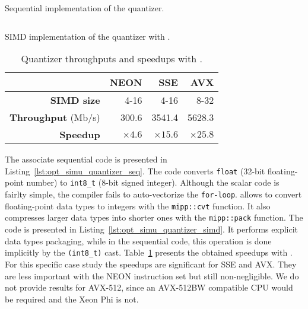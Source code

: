 \begin{listing}[htp]
  \inputminted[frame=lines,linenos]{C++}{\curChapter/src/simu/quantizer/quantizer_seq.cpp}
  \caption{Sequential implementation of the quantizer.}
  \label{lst:opt_simu_quantizer_seq}
\end{listing}

\begin{listing}[htp]
  \inputminted[frame=lines,linenos]{C++}{\curChapter/src/simu/quantizer/quantizer_simd.cpp}
  \caption{SIMD implementation of the quantizer with \MIPP.}
  \label{lst:opt_simu_quantizer_simd}
\end{listing}

\begin{table}[htp]
  \centering
  \caption{Quantizer throughputs and speedups with \MIPP.}
  \label{tab:opt_simu_quantizer_speedup}
  \begin{tabular}{r | r  r r}
                             & \textbf{NEON} & \textbf{SSE}  & \textbf{AVX}  \\ \hline \hline
  \textbf{SIMD size}         & 4-16          & 4-16          & 8-32          \\ %
  \textbf{Throughput} (Mb/s) & 300.6         & 3541.4        & 5628.3        \\ %
  \textbf{Speedup}           & $\times 4.6$  & $\times 15.6$ & $\times 25.8$ \\
  \end{tabular}
\end{table}

The associate sequential code is presented in
Listing~\ref{lst:opt_simu_quantizer_seq}. The code converts \verb|float| (32-bit
floating-point number) to \verb|int8_t| (8-bit signed integer). Although the
scalar code is fairlty simple, the compiler fails to auto-vectorize the
\verb|for-loop|. \MIPP allows to convert floating-point data types to integers
with the \verb|mipp::cvt| function. It also compresses larger data types into
shorter ones with the \verb|mipp::pack| function. The \MIPP code is presented in
Listing~\ref{lst:opt_simu_quantizer_simd}. It performs explicit data types
packaging, while in the sequential code, this operation is done implicitly by
the \verb|(int8_t)| cast. Table~\ref{tab:opt_simu_quantizer_speedup} presents
the obtained speedups with \MIPP. For this specific case study the speedups are
significant for SSE and AVX. They are less important with the NEON instruction
set but still non-negligible. We do not provide results for AVX-512, since an
AVX-512BW compatible CPU would be required and the Xeon Phi is not.


